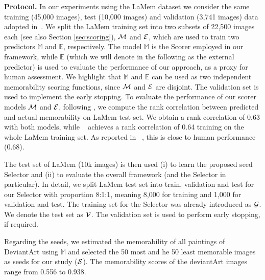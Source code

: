 \documentclass{sig-alternate-05-2015}
\begin{document}
\begin{sloppypar}
\textbf{Protocol.} In our experiments using the LaMem dataset we consider the same training (45,000 images), test (10,000 images) and validation (3,741 images) data adopted in~\cite{khosla2015understanding}. We split the LaMem training set into two subsets of 22,500 images each (see also Section \ref{sec:scoring}), ${\cal M}$ and ${\cal E}$, which are used to train two predictors $\mathbb{M}$ and 
$\mathbb{E}$, respectively. The model $\mathbb{M}$ is the Scorer employed in our framework, while $\mathbb{E}$ (which we will denote in the following as the external predictor) is used to evaluate the performance of our approach, as a proxy for human assessment. We highlight that $\mathbb{M}$ and $\mathbb{E}$ can be used as two independent memorability scoring functions, since ${\cal M}$ and ${\cal E}$ are disjoint. The validation set is used to implement the early stopping.
To evaluate the performance of our scorer models ${\cal M}$ and ${\cal E}$, following \cite{khosla2015understanding}, we compute the rank correlation between predicted and actual memorability on LaMem test set. We obtain a rank correlation of 0.63 with both models, while ~\cite{khosla2015understanding} achieves a rank correlation of 0.64 training on the whole LaMem training set. As reported in ~\cite{khosla2015understanding}, this is close to human performance (0.68).

The test set of LaMem ($10$k images) is then used (i) to learn the proposed seed Selector and (ii) to evaluate the overall framework (and the Selector in particular). In detail, we split LaMem test set into train, validation and test for our Selector with proportion 8:1:1, meaning 8,000 for training and 1,000 for validation and test. The training set for the Selector was already introduced as ${\cal G}$. We denote the test set as ${\cal V}$. The validation set is used to perform early stopping, if required. 

Regarding the seeds, we estimated the memorability of all paintings of DeviantArt using $\mathbb{M}$ and selected the 50 most and he 50 least memorable images as seeds for our study (${\cal S}$). The memorability scores of the deviantArt images range from 0.556 to 0.938. 
\end{sloppypar}
\end{document}
